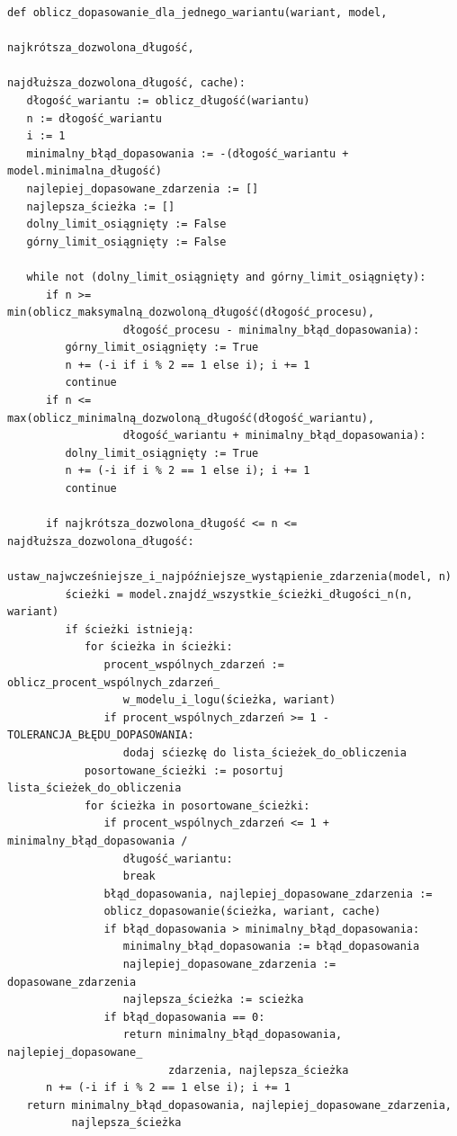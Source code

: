 \lstset{caption=Obliczanie dopasowania dla jednego wariantu, captionpos=b}
\lstset{label=src:best_result, frame=single}
\begin{lstlisting}
def oblicz_dopasowanie_dla_jednego_wariantu(wariant, model, 
                                            najkrótsza_dozwolona_długość, 
                                            najdłuższa_dozwolona_długość, cache):
   dłogość_wariantu := oblicz_długość(wariantu)
   n := dłogość_wariantu
   i := 1
   minimalny_błąd_dopasowania := -(dłogość_wariantu + model.minimalna_długość)
   najlepiej_dopasowane_zdarzenia := []
   najlepsza_ścieżka := []
   dolny_limit_osiągnięty := False
   górny_limit_osiągnięty := False
   
   while not (dolny_limit_osiągnięty and górny_limit_osiągnięty):
      if n >= min(oblicz_maksymalną_dozwoloną_długość(dłogość_procesu), 
                  dłogość_procesu - minimalny_błąd_dopasowania):
         górny_limit_osiągnięty := True
         n += (-i if i % 2 == 1 else i); i += 1
         continue
      if n <= max(oblicz_minimalną_dozwoloną_długość(dłogość_wariantu), 
                  dłogość_wariantu + minimalny_błąd_dopasowania):
         dolny_limit_osiągnięty := True
         n += (-i if i % 2 == 1 else i); i += 1
         continue
         
      if najkrótsza_dozwolona_długość <= n <= najdłuższa_dozwolona_długość:
         ustaw_najwcześniejsze_i_najpóźniejsze_wystąpienie_zdarzenia(model, n)
         ścieżki = model.znajdź_wszystkie_ścieżki_długości_n(n, wariant)
         if ścieżki istnieją:
            for ścieżka in ścieżki:
               procent_wspólnych_zdarzeń := oblicz_procent_wspólnych_zdarzeń_
                  w_modelu_i_logu(ścieżka, wariant)
               if procent_wspólnych_zdarzeń >= 1 - TOLERANCJA_BŁĘDU_DOPASOWANIA:
                  dodaj sćiezkę do lista_ścieżek_do_obliczenia
            posortowane_ścieżki := posortuj lista_ścieżek_do_obliczenia
            for ścieżka in posortowane_ścieżki:
               if procent_wspólnych_zdarzeń <= 1 + minimalny_błąd_dopasowania /
                  długość_wariantu:
                  break
               błąd_dopasowania, najlepiej_dopasowane_zdarzenia :=
               oblicz_dopasowanie(ścieżka, wariant, cache)
               if błąd_dopasowania > minimalny_błąd_dopasowania:
                  minimalny_błąd_dopasowania := błąd_dopasowania
                  najlepiej_dopasowane_zdarzenia := dopasowane_zdarzenia
                  najlepsza_ścieżka := scieżka
               if błąd_dopasowania == 0:
                  return minimalny_błąd_dopasowania, najlepiej_dopasowane_
                         zdarzenia, najlepsza_ścieżka
      n += (-i if i % 2 == 1 else i); i += 1
   return minimalny_błąd_dopasowania, najlepiej_dopasowane_zdarzenia, 
          najlepsza_ścieżka
\end{lstlisting}

